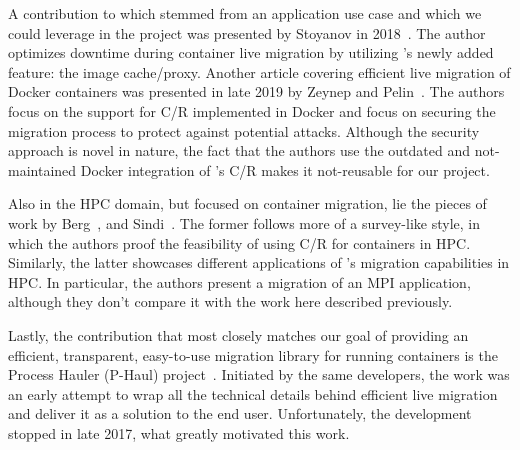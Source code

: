 A contribution to \criu which stemmed from an application use case and which we could leverage in the project was presented by Stoyanov in 2018~\cite{Stoyanov2018}.
The author optimizes downtime during container live migration by utilizing \criu's newly added feature: the image cache/proxy.
Another article covering efficient live migration of Docker containers was presented in late 2019 by Zeynep and Pelin~\cite{Zeynep2019}.
The authors focus on the support for C/R implemented in Docker and focus on securing the migration process to protect against potential attacks.
Although the security approach is novel in nature, the fact that the authors use the outdated and not-maintained Docker integration of \criu's C/R makes it not-reusable for our project.

Also in the HPC domain, but focused on container migration, lie the pieces of work by Berg~\cite{Berg2017}, and Sindi~\cite{Sindi2019}.
The former follows more of a survey-like style, in which the authors proof the feasibility of using C/R for containers in HPC.
Similarly, the latter showcases different applications of \criu's migration capabilities in HPC.
In particular, the authors present a migration of an MPI application, although they don't compare it with the work here described previously.

Lastly, the contribution that most closely matches our goal of providing an efficient, transparent, easy-to-use migration library for running containers is the Process Hauler (P-Haul) project~\cite{phaul-criu,phaul-github}.
Initiated by the same \criu developers, the work was an early attempt to wrap all the technical details behind efficient live migration and deliver it as a solution to the end user.
Unfortunately, the development stopped in late 2017, what greatly motivated this work.
